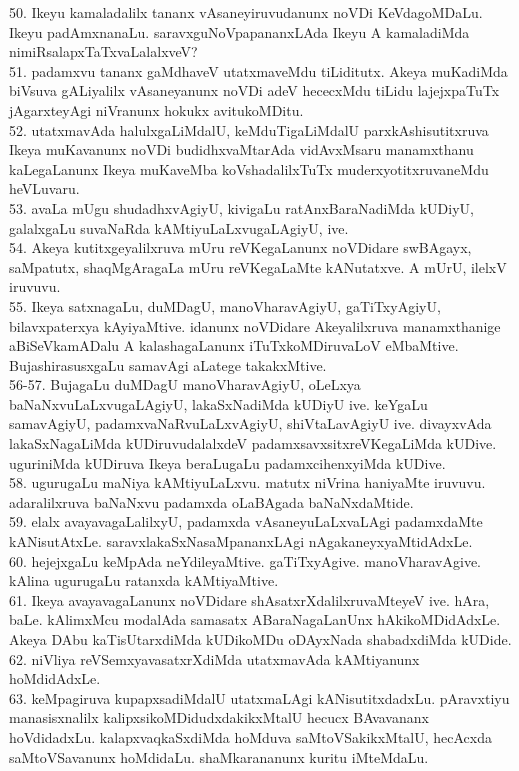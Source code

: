\documentclass{article}
\begin{document}
50. Ikeyu kamaladalilx tananx vAsaneyiruvudanunx noVDi KeVdagoMDaLu. Ikeyu padAmxnanaLu. saravxguNoVpapananxLAda Ikeyu A kamaladiMda nimiRsalapxTaTxvaLalalxveV?\\
51. padamxvu tananx gaMdhaveV utatxmaveMdu tiLiditutx. Akeya muKadiMda biVsuva gALiyalilx vAsaneyanunx noVDi adeV hececxMdu tiLidu lajejxpaTuTx jAgarxteyAgi niVranunx hokukx avitukoMDitu.\\
52. utatxmavAda halulxgaLiMdalU, keMduTigaLiMdalU parxkAshisutitxruva Ikeya muKavanunx noVDi budidhxvaMtarAda vidAvxMsaru manamxthanu kaLegaLanunx Ikeya muKaveMba koVshadalilxTuTx muderxyotitxruvaneMdu heVLuvaru.\\
53. avaLa mUgu shudadhxvAgiyU, kivigaLu ratAnxBaraNadiMda kUDiyU, galalxgaLu suvaNaRda kAMtiyuLaLxvugaLAgiyU, ive.\\
54. Akeya kutitxgeyalilxruva mUru reVKegaLanunx noVDidare swBAgayx, saMpatutx, shaqMgAragaLa mUru reVKegaLaMte kANutatxve. A mUrU, ilelxV iruvuvu.\\
55. Ikeya satxnagaLu, duMDagU, manoVharavAgiyU, gaTiTxyAgiyU, bilavxpaterxya kAyiyaMtive. idanunx noVDidare Akeyalilxruva manamxthanige aBiSeVkamADalu A kalashagaLanunx iTuTxkoMDiruvaLoV eMbaMtive. BujashirasusxgaLu samavAgi aLatege takakxMtive.\\
56-57. BujagaLu duMDagU manoVharavAgiyU, oLeLxya baNaNxvuLaLxvugaLAgiyU, lakaSxNadiMda kUDiyU ive. keYgaLu samavAgiyU, padamxvaNaRvuLaLxvAgiyU, shiVtaLavAgiyU ive. divayxvAda lakaSxNagaLiMda kUDiruvudalalxdeV padamxsavxsitxreVKegaLiMda kUDive. uguriniMda kUDiruva Ikeya beraLugaLu padamxcihenxyiMda kUDive.\\
58. ugurugaLu maNiya kAMtiyuLaLxvu. matutx niVrina haniyaMte iruvuvu. adaralilxruva baNaNxvu padamxda oLaBAgada baNaNxdaMtide.\\
59. elalx avayavagaLalilxyU, padamxda vAsaneyuLaLxvaLAgi padamxdaMte kANisutAtxLe. saravxlakaSxNasaMpananxLAgi nAgakaneyxyaMtidAdxLe.\\
60. hejejxgaLu keMpAda neYdileyaMtive. gaTiTxyAgive. manoVharavAgive. kAlina ugurugaLu ratanxda kAMtiyaMtive.\\
61. Ikeya avayavagaLanunx noVDidare shAsatxrXdalilxruvaMteyeV ive. hAra, baLe. kAlimxMcu modalAda samasatx ABaraNagaLanUnx hAkikoMDidAdxLe. Akeya DAbu kaTisUtarxdiMda kUDikoMDu oDAyxNada shabadxdiMda kUDide.\\
62. niVliya reVSemxyavasatxrXdiMda utatxmavAda kAMtiyanunx hoMdidAdxLe.\\
63. keMpagiruva kupapxsadiMdalU utatxmaLAgi kANisutitxdadxLu. pAravxtiyu manasisxnalilx kalipxsikoMDidudxdakikxMtalU hecucx BAvavananx hoVdidadxLu. kalapxvaqkaSxdiMda hoMduva saMtoVSakikxMtalU, hecAcxda saMtoVSavanunx hoMdidaLu. shaMkarananunx kuritu iMteMdaLu.\\
\end{document}
